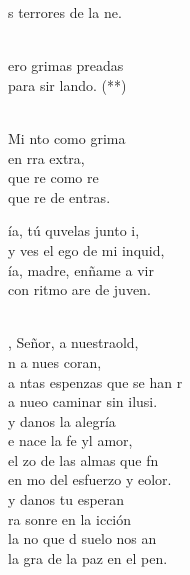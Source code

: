 \documentclass[12pt]{article}
\begin{document}
\begin{multicols*}{2}
\begin{cancion}
	s terrores de la ne.\\\jump\\
	\begin{chorus}%
	ero grimas preadas \\
	para sir lando. (**) \\
	\end{chorus}%
	\jump\\
	Mi nto como grima  \\
	en rra extra,\\
	que re como re \\
	que re de  entras.\\
\end{cancion}%

\begin{cancion}%
	\begin{chorus}%
	ía, tú quvelas junto i,\\
	y ves el ego de mi inquid,\\
	ía, madre, enñame a vir \\
	con ritmo are de juven.\\
	\end{chorus}%
	\jump\\
	, Señor, a nuestraold,\\
	n a nues coran,\\
	a ntas espenzas que se han r\\
	a nueo caminar sin ilusi.\\
\jump
	 y danos la alegría \\
	e nace la fe yl amor,\\
	el zo de las almas que fn\\
	en mo del esfuerzo y eolor.\\
\jump
	 y danos tu esperan  \\
	ra sonre en la icción\\
	la no que d suelo nos an\\
	la gra de la paz en el pen. \\
\end{cancion}%


\end{multicols*}
\end{document}
